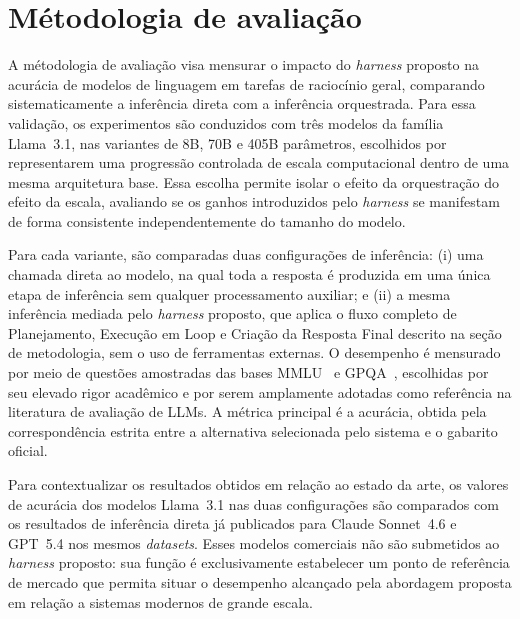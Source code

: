 \documentclass[a4paper,10pt,twocolumn]{article}
\begin{document}
\section{Métodologia de avaliação}

A métodologia de avaliação visa mensurar o impacto do \textit{harness} proposto na acurácia de modelos de linguagem em tarefas de raciocínio geral, comparando sistematicamente a inferência direta com a inferência orquestrada. Para essa validação, os experimentos são conduzidos com três modelos da família Llama~3.1, nas variantes de 8B, 70B e 405B parâmetros, escolhidos por representarem uma progressão controlada de escala computacional dentro de uma mesma arquitetura base. Essa escolha permite isolar o efeito da orquestração do efeito da escala, avaliando se os ganhos introduzidos pelo \textit{harness} se manifestam de forma consistente independentemente do tamanho do modelo.

Para cada variante, são comparadas duas configurações de inferência: (i) uma chamada direta ao modelo, na qual toda a resposta é produzida em uma única etapa de inferência sem qualquer processamento auxiliar; e (ii) a mesma inferência mediada pelo \textit{harness} proposto, que aplica o fluxo completo de Planejamento, Execução em Loop e Criação da Resposta Final descrito na seção de metodologia, sem o uso de ferramentas externas. O desempenho é mensurado por meio de questões amostradas das bases MMLU~\cite{hendrycks2021measuring} e GPQA~\cite{rein2023gpqa}, escolhidas por seu elevado rigor acadêmico e por serem amplamente adotadas como referência na literatura de avaliação de LLMs. A métrica principal é a acurácia, obtida pela correspondência estrita entre a alternativa selecionada pelo sistema e o gabarito oficial.

Para contextualizar os resultados obtidos em relação ao estado da arte, os valores de acurácia dos modelos Llama~3.1 nas duas configurações são comparados com os resultados de inferência direta já publicados para Claude Sonnet~4.6 e GPT~5.4 nos mesmos \textit{datasets}. Esses modelos comerciais não são submetidos ao \textit{harness} proposto: sua função é exclusivamente estabelecer um ponto de referência de mercado que permita situar o desempenho alcançado pela abordagem proposta em relação a sistemas modernos de grande escala.

\end{document}
